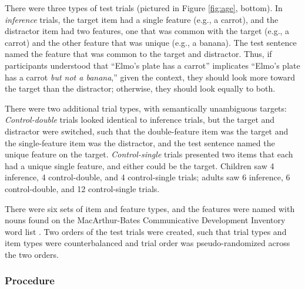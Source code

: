 \documentclass[10pt,letterpaper]{article}
\begin{document}
There were three types of test trials (pictured in Figure \ref{fig:age}, bottom). In \emph{inference} trials, the target item had a single feature (e.g., a carrot), and the distractor item had two features, one that was common with the target (e.g., a carrot) and the other feature that was unique (e.g., a banana). The test sentence named the feature that was common to the target and distractor. Thus, if participants understood that ``Elmo's plate has a carrot'' implicates ``Elmo's plate has a carrot \emph{but not a banana},'' given the context, they should look more toward the target than the distractor; otherwise, they should look equally to both.

There were two additional trial types, with semantically unambiguous targets: \emph{Control-double} trials looked identical to inference trials, but the target and distractor were switched, such that the double-feature item was the target and the single-feature item was the distractor, and the test sentence named the unique feature on the target. \emph{Control-single} trials presented two items that each had a unique single feature, and either could be the target. Children saw 4 inference, 4 control-double, and 4 control-single trials; adults saw 6 inference, 6 control-double, and 12 control-single trials. 


There were six sets of item and feature types, and the features were named with nouns found on the  MacArthur-Bates Communicative Development Inventory word list \cite{fenson1994}. Two orders of the test trials were created, such that trial types and item types were counterbalanced and trial order was pseudo-randomized across the two orders.

\subsubsection{Procedure}
\end{document}
